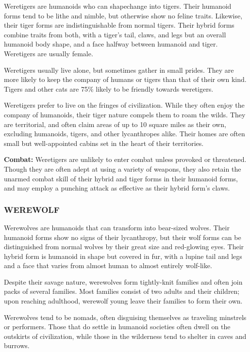 \begin{multicols}{2}
Weretigers are humanoids who can shapechange into tigers. Their humanoid forms tend to be lithe and nimble, but otherwise show no feline traits. Likewise, their tiger forms are indistinguishable from normal tigers. Their hybrid forms combine traits from both, with a tiger's tail, claws, and legs but an overall humanoid body shape, and a face halfway between humanoid and tiger. Weretigers are usually female.

Weretigers usually live alone, but sometimes gather in small prides. They are more likely to keep the company of humans or tigers than that of their own kind. Tigers and other cats are 75\% likely to be friendly towards weretigers.

Weretigers prefer to live on the fringes of civilization. While they often enjoy the company of humanoids, their tiger nature compels them to roam the wilds. They are territorial, and often claim areas of up to 10 square miles as their own, excluding humanoids, tigers, and other lycanthropes alike. Their homes are often small but well-appointed cabins set in the heart of their territories.

\textbf{Combat:} Weretigers are unlikely to enter combat unless provoked or threatened. Though they are often adept at using a variety of weapons, they also retain the unarmed combat skill of their hybrid and tiger forms in their humanoid forms, and may employ a punching attack as effective as their hybrid form's claws.

\subsubsection{WEREWOLF}

Werewolves are humanoids that can transform into bear-sized wolves. Their humanoid forms show no signs of their lycanthropy, but their wolf forms can be distinguished from normal wolves by their great size and red-glowing eyes. Their hybrid form is humanoid in shape but covered in fur, with a lupine tail and legs and a face that varies from almost human to almost entirely wolf-like.

Despite their savage nature, werewolves form tightly-knit families and often join packs of several families. Most families consist of two adults and their children; upon reaching adulthood, werewolf young leave their families to form their own.

Werewolves tend to be nomads, often disguising themselves as traveling minstrels or performers. Those that do settle in humanoid societies often dwell on the outskirts of civilization, while those in the wilderness tend to shelter in caves and burrows.


\end{multicols}
